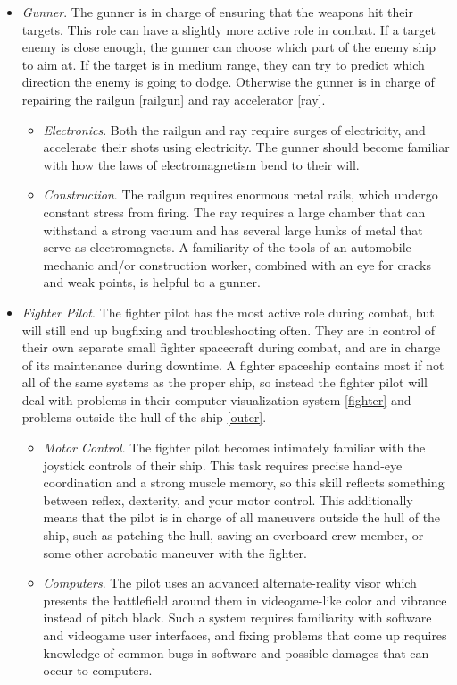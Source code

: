 \documentclass[a4paper]{article}
\begin{document}
\begin{itemize}
\begin{itemize}
\end{itemize}
\item \textit{Gunner}. The gunner is in charge of ensuring that the weapons hit their targets. This role can have a slightly more active role in combat. If a target enemy is close enough, the gunner can choose which part of the enemy ship to aim at. If the target is in medium range, they can try to predict which direction the enemy is going to dodge. Otherwise the gunner is in charge of repairing the railgun \ref{railgun} and ray accelerator \ref{ray}.
\begin{itemize}
\item \textit{Electronics}. Both the railgun and ray require surges of electricity, and accelerate their shots using electricity. The gunner should become familiar with how the laws of electromagnetism bend to their will.
\item \textit{Construction}. The railgun requires enormous metal rails, which undergo constant stress from firing. The ray requires a large chamber that can withstand a strong vacuum and has several large hunks of metal that serve as electromagnets. A familiarity of the tools of an automobile mechanic and/or construction worker, combined with an eye for cracks and weak points, is helpful to a gunner.
\end{itemize}
\item \textit{Fighter Pilot}. The fighter pilot has the most active role during combat, but will still end up bugfixing and troubleshooting often. They are in control of their own separate small fighter spacecraft during combat, and are in charge of its maintenance during downtime. A fighter spaceship contains most if not all of the same systems as the proper ship, so instead the fighter pilot will deal with problems in their computer visualization system \ref{fighter} and problems outside the hull of the ship \ref{outer}. 
\begin{itemize}
\item \textit{Motor Control}. The fighter pilot becomes intimately familiar with the joystick controls of their ship. This task requires precise hand-eye coordination and a strong muscle memory, so this skill reflects something between reflex, dexterity, and your motor control. This additionally means that the pilot is in charge of all maneuvers outside the hull of the ship, such as patching the hull, saving an overboard crew member, or some other acrobatic maneuver with the fighter.
\item \textit{Computers}. The pilot uses an advanced alternate-reality visor which presents the battlefield around them in videogame-like color and vibrance instead of pitch black. Such a system requires familiarity with software and videogame user interfaces, and fixing problems that come up requires knowledge of common bugs in software and possible damages that can occur to computers.
\end{itemize}
\end{itemize}
\end{document}
